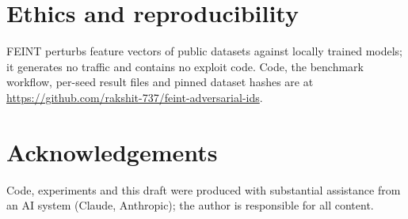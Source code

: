 \documentclass[11pt]{article}
\begin{document}
\section{Ethics and reproducibility}
FEINT perturbs feature vectors of public datasets against locally trained models; it generates no
traffic and contains no exploit code. Code, the benchmark workflow, per-seed result files and
pinned dataset hashes are at \url{https://github.com/rakshit-737/feint-adversarial-ids}.

\section*{Acknowledgements}
Code, experiments and this draft were produced with substantial assistance from an AI system
(Claude, Anthropic); the author is responsible for all content.



\end{document}

